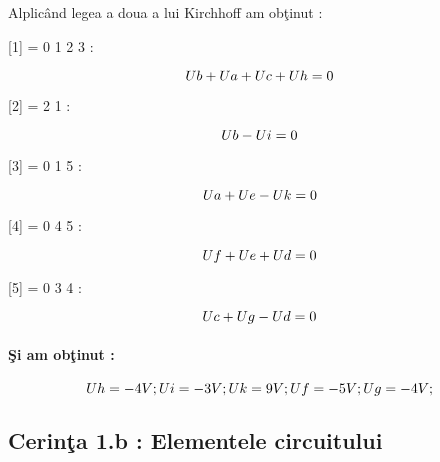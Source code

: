 \documentclass[12pt,twoside]{report}
\numberwithin{figure}{section}
\begin{document}
		{\large Alplic\^{a}nd legea a doua a lui Kirchhoff am ob\c{t}inut :}
		
		{\large [1] = {0 1 2 3} :}
		
		\begin{equation}
		U\small{b} + U\small{a} + U\small{c} + U\small{h} = 0
		\end{equation}
		
		{\large [2] = {2 1} :}
		
		\begin{equation}
		U\small{b} - U\small{i} = 0
		\end{equation}
		
		
			
		{\large [3] = {0 1 5} :}
		
		\begin{equation}
		U\small{a} + U\small{e} - U\small{k} = 0
		\end{equation}
	
		
			
		{\large [4] = {0 4 5} :}
		
		\begin{equation}
		U\small{f} + U\small{e} + U\small{d} = 0
		\end{equation}
		
		
			
		{\large [5] = {0 3 4} :}
		
		\begin{equation}
		U\small{c} + U\small{g} - U\small{d} = 0
		\end{equation}

		
		\paragraph{\c{S}i am ob\c{t}inut :}
		
		\begin{equation}
		U\small{h} = -4 V;
		U\small{i} = -3 V;
		U\small{k} = 9 V;
		U\small{f} = -5 V;
		U\small{g} = -4 V;
		\end{equation}
		
	
	
			\subsection{Cerin\c{t}a 1.b : Elementele circuitului}
			
\end{document}
